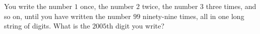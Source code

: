 You write the number $1$ once, the number $2$ twice, the number $3$ three times, and so on, until you have written the number $99$ ninety-nine times, all in one long string of digits. What is the $2005$th digit you write?
